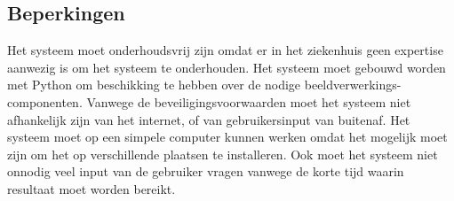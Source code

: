 \subsection{Beperkingen}
Het systeem moet onderhoudsvrij zijn omdat er in het ziekenhuis geen expertise aanwezig is om het systeem te onderhouden.
Het systeem moet gebouwd worden met Python om beschikking te hebben over de nodige beeldverwerkings-componenten.
Vanwege de beveiligingsvoorwaarden moet het systeem niet afhankelijk zijn van het internet, of van gebruikersinput van buitenaf.
Het systeem moet op een simpele computer kunnen werken omdat het mogelijk moet zijn om het op verschillende plaatsen te installeren.
Ook moet het systeem niet onnodig veel input van de gebruiker vragen vanwege de korte tijd waarin resultaat moet worden bereikt.